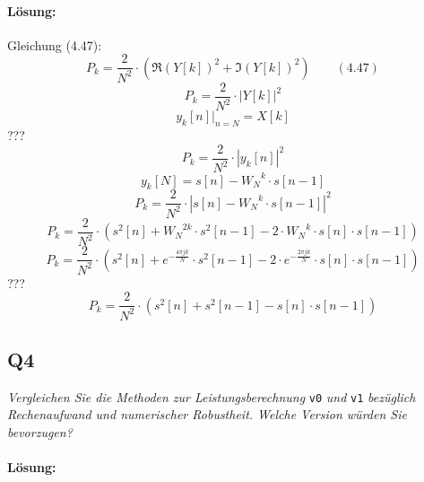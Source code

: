 \documentclass[a4,paper,fleqn]{article}
\begin{document}
\paragraph{Lösung: }
Gleichung (4.47):
\[
    P_k =
    \frac{2}{N^2} \cdot
    \left(
        \Re(Y[k])^2 + \Im(Y[k])^2
    \right)
    \qquad (4.47)
\]
\[
    P_k =
    \frac{2}{N^2} \cdot
    \left|
        Y[k]
    \right|^2
\]
\[
    y_k[n] |_{n = N} = X[k]
\]
???
\[
    P_k =
    \frac{2}{N^2} \cdot
    \left|
        y_k[n]
    \right|^2
\]
\[
    y_k[N] = s[n] - {W_N}^{k} \cdot s[n-1]
\]
\[
    P_k =
    \frac{2}{N^2} \cdot
    \left|
        s[n] - {W_N}^{k} \cdot s[n-1]
    \right|^2
\]
\[
    P_k =
    \frac{2}{N^2} \cdot
    \left(
        s^2[n] +
        {W_N}^{2k} \cdot s^2[n-1] -
        2 \cdot {W_N}^{k} \cdot s[n] \cdot s[n-1]
    \right)
\]
\[
    P_k =
    \frac{2}{N^2} \cdot
    \left(
        s^2[n] +
        e^{-\frac{4 \pi j k}{N}} \cdot s^2[n-1] -
        2 \cdot e^{-\frac{2 \pi j k}{N}} \cdot s[n] \cdot s[n-1]
    \right)
\]
???
\[
    P_k =
    \frac{2}{N^2} \cdot
    \left(
        s^2[n]
        + s^2[n-1]
        - s[n] \cdot s[n-1]
    \right)
\]

\subsection{Q4}
\label{q4}
\emph{Vergleichen Sie die Methoden zur Leistungsberechnung}
\verb?v0?
\emph{und}
\verb?v1?
\emph{bezüglich Rechenaufwand und numerischer Robustheit. Welche Version 
würden Sie bevorzugen?}
\paragraph{Lösung: }
\end{document}
